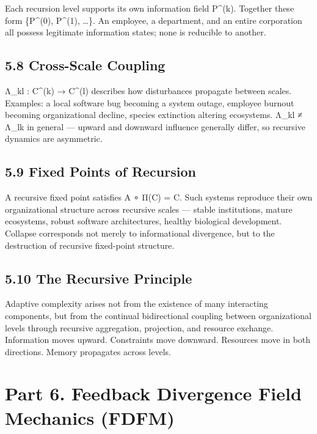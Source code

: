 \documentclass[
]{article}
\begin{document}
Each recursion level supports its own information field P\^{}(k).
Together these form \{P\^{}(0), P\^{}(1), \ldots\}. An employee, a
department, and an entire corporation all possess legitimate information
states; none is reducible to another.

\hypertarget{cross-scale-coupling}{%
\subsection{5.8 Cross-Scale Coupling}\label{cross-scale-coupling}}

Λ\_kl : C\^{}(k) → C\^{}(l) describes how disturbances propagate between
scales. Examples: a local software bug becoming a system outage,
employee burnout becoming organizational decline, species extinction
altering ecosystems. Λ\_kl ≠ Λ\_lk in general --- upward and downward
influence generally differ, so recursive dynamics are asymmetric.

\hypertarget{fixed-points-of-recursion}{%
\subsection{5.9 Fixed Points of
Recursion}\label{fixed-points-of-recursion}}

A recursive fixed point satisfies A ∘ Π(C) = C. Such systems reproduce
their own organizational structure across recursive scales --- stable
institutions, mature ecosystems, robust software architectures, healthy
biological development. Collapse corresponds not merely to informational
divergence, but to the destruction of recursive fixed-point structure.

\hypertarget{the-recursive-principle}{%
\subsection{5.10 The Recursive
Principle}\label{the-recursive-principle}}

Adaptive complexity arises not from the existence of many interacting
components, but from the continual bidirectional coupling between
organizational levels through recursive aggregation, projection, and
resource exchange. Information moves upward. Constraints move downward.
Resources move in both directions. Memory propagates across levels.

\hypertarget{part-6.-feedback-divergence-field-mechanics-fdfm}{%
\section{Part 6. Feedback Divergence Field Mechanics
(FDFM)}\label{part-6.-feedback-divergence-field-mechanics-fdfm}}
\end{document}
